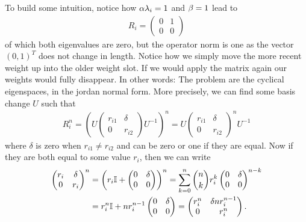 To build some intuition, notice how \(\alpha\lambda_i=1\) and \(\beta=1\)
lead to
\begin{align*}
	R_i
	=\begin{pmatrix}
		0 & 1 \\
		0 & 0
	\end{pmatrix}
\end{align*}
of which both eigenvalues are zero, but the operator norm is one as the vector
\((0, 1)^T\) does not change in length. Notice how we simply move the more
recent weight up into the older weight slot. If we would apply the matrix again
our weights would fully disappear. In other words: The problem are the cyclical
eigenspaces, in the jordan normal form. More precisely, we can find some
basis change \(U\) such that
\begin{align*}
	R_i^n
	= \left(U 
		\begin{pmatrix}
			r_{i1} & \delta\\
			0 & r_{i2}
		\end{pmatrix}
	U^{-1}\right)^n
	= U 
	\begin{pmatrix}
		r_{i1} & \delta\\
		0 & r_{i2}
	\end{pmatrix}^n
	 U^{-1}
\end{align*}
where \(\delta\) is zero when \(r_{i1}\neq r_{i2}\) and can be zero or one if
they are equal. Now if they are both equal to some value \(r_i\), then we
can write
\begin{align*}
	\begin{pmatrix}
		r_i & \delta\\
		0 & r_i
	\end{pmatrix}^n
	&= \left(r_i\mathbb{I} + 
	\begin{pmatrix}
		0 & \delta\\
		0 & 0 
	\end{pmatrix}\right)^n
	= \sum_{k=0}^n \binom{n}{k} r_i^k \begin{pmatrix}
		0 & \delta \\
		0 & 0
	\end{pmatrix}^{n-k}\\
	&= r_i^n\mathbb{I} + n r_i^{n-1}\begin{pmatrix}
		0 & \delta \\
		0 & 0
	\end{pmatrix}
	= \begin{pmatrix}
		r_i^n & \delta n r_i^{n-1} \\
		0 & r_i^n
	\end{pmatrix}.
\end{align*}
